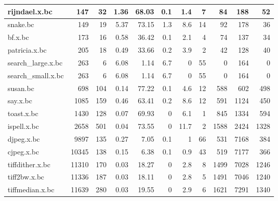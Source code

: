 \begin{tabular}{|l|r|r|r|r|r|r|r|r|r|r|}
\hline
 rijndael.x.bc        &      147 &   32 &   1.36 &    68.03 &    0.1 &      1.4 &     7 &      84 &        188 &        52 \\
\hline
 snake.bc             &      149 &   19 &   5.37 &    73.15 &    1.3 &      8.6 &    14 &      92 &        178 &        36 \\
\hline
 bf.x.bc              &      173 &   16 &   0.58 &    36.42 &    0.1 &      2.1 &     4 &      74 &        137 &        34 \\
\hline
 patricia.x.bc        &      205 &   18 &   0.49 &    33.66 &    0.2 &      3.9 &     2 &      42 &        128 &        40 \\
\hline
 search\_large.x.bc    &      263 &    6 &   6.08 &     1.14 &    6.7 &      0   &    55 &       0 &        164 &         0 \\
\hline
 search\_small.x.bc    &      263 &    6 &   6.08 &     1.14 &    6.7 &      0   &    55 &       0 &        164 &         0 \\
\hline
 susan.bc             &      698 &  104 &   0.14 &    77.22 &    0.1 &      4.6 &    12 &     588 &        602 &       498 \\
\hline
 say.x.bc             &     1085 &  159 &   0.46 &    63.41 &    0.2 &      8.6 &    12 &     591 &       1124 &       450 \\
\hline
 toast.x.bc           &     1430 &  128 &   0.07 &    69.93 &    0   &      6.1 &     1 &     845 &       1334 &       594 \\
\hline
 ispell.x.bc          &     2658 &  501 &   0.04 &    73.55 &    0   &     11.7 &     2 &    1588 &       2424 &      1328 \\
\hline
 djpeg.x.bc           &     9897 &  135 &   0.27 &     7.05 &    0.1 &      1   &    66 &     531 &       7168 &       384 \\
\hline
 cjpeg.x.bc           &    10345 &  138 &   0.15 &     6.38 &    0.1 &      0.9 &    43 &     519 &       7177 &       366 \\
\hline
 tiffdither.x.bc      &    11310 &  170 &   0.03 &    18.27 &    0   &      2.8 &     8 &    1499 &       7028 &      1246 \\
\hline
 tiff2bw.x.bc         &    11336 &  187 &   0.03 &    18.11 &    0   &      2.8 &     5 &    1491 &       7046 &      1240 \\
\hline
 tiffmedian.x.bc      &    11639 &  280 &   0.03 &    19.55 &    0   &      2.9 &     6 &    1621 &       7291 &      1340 \\
\hline
\end{tabular}

